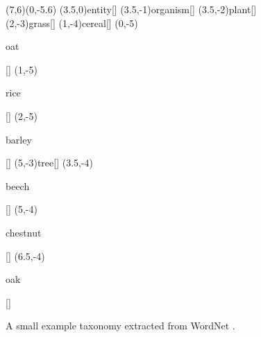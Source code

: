 \documentclass{report}
\begin{document}
\begin{figure}
\begin{center}
\begin{graph}(7,6)(0,-5.6)
(3.5,0){entity}[]
(3.5,-1){organism}[]
(3.5,-2){plant}[]
	(2,-3){grass}[]
	(1,-4){cereal}[]
		(0,-5){\rule[-0.5ex]{0pt}{2.1ex}oat}[]
		(1,-5){\rule[-0.5ex]{0pt}{2.1ex}rice}[]
		(2,-5){\rule[-0.5ex]{0pt}{2.1ex}barley}[]
	(5,-3){tree}[]
		(3.5,-4){\rule{0pt}{2ex}beech}[]
		(5,-4){\rule{0pt}{2ex}chestnut}[]
		(6.5,-4){\rule{0pt}{2ex}oak}[]



\end{graph}
\end{center}
\caption{A small example taxonomy extracted from WordNet \citep{Fellbaum:98}.}
\label{plant-taxonomy}
\end{figure}

%

\end{document}
